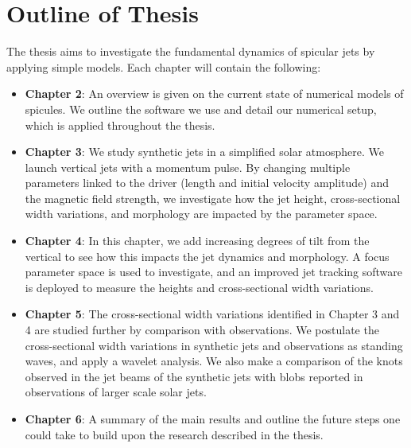 \documentclass[12pt]{ociamthesis}
\begin{document}
\section{Outline of Thesis}
\label{section:outline}
The thesis aims to investigate the fundamental dynamics of spicular jets by applying simple models. Each chapter will contain the following:
\begin{itemize}
    \item {\bf{Chapter 2}}: An overview is given on the current state of numerical models of spicules. We outline the software we use and detail our numerical setup, which is applied throughout the thesis.
    \item {\bf{Chapter 3}}: We study synthetic jets in a simplified solar atmosphere. We launch vertical jets with a momentum pulse. By changing multiple parameters linked to the driver (length and initial velocity amplitude) and the magnetic field strength, we investigate how the jet height, cross-sectional width variations, and morphology are impacted by the parameter space.
    \item {\bf{Chapter 4}}: In this chapter, we add increasing degrees of tilt from the vertical to see how this impacts the jet dynamics and morphology. A focus parameter space is used to investigate, and an improved jet tracking software is deployed to measure the heights and cross-sectional width variations.     
    \item {\bf{Chapter 5}}: The cross-sectional width variations identified in Chapter 3 and 4 are studied further by comparison with observations. We postulate the cross-sectional width variations in synthetic jets and observations as standing waves, and apply a wavelet analysis. We also make a comparison of the knots observed in the jet beams of the synthetic jets with blobs reported in observations of larger scale solar jets.   
    \item {\bf{Chapter 6}}: A summary of the main results and outline the future steps one could take to build upon the research described in the thesis.  
\end{itemize}


  
\end{document}
